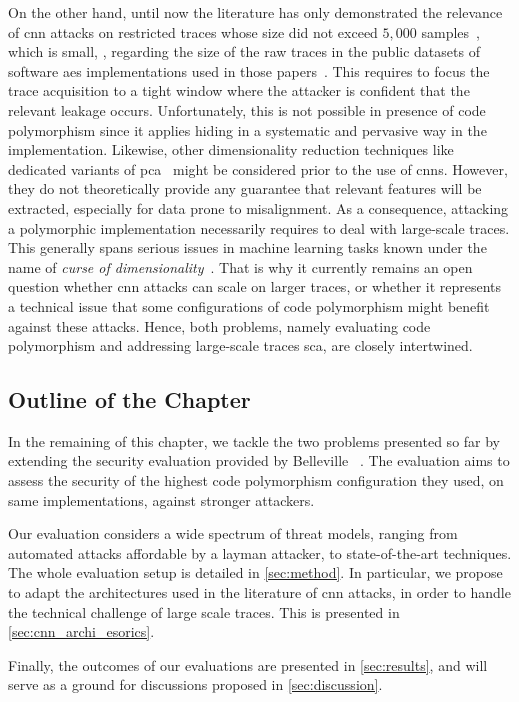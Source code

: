 On the other hand, until now the literature has only demonstrated the relevance of \gls{cnn} attacks on restricted traces whose size did not exceed \(5,000\) samples~\cite{cagli_convolutional_2017,prouff_study_2018,kim_make_2019,timon_non-profiled_2019,zaid_methodology_2019}, which is small, \eg{}, regarding the size of the raw traces in the public datasets of software \gls{aes} implementations used in those papers~\cite{dpa_v4,prouff_study_2018,coron_random_2009}.
This requires to focus the trace acquisition to a tight window where the attacker is confident that the relevant leakage occurs.
Unfortunately, this is not possible in presence of code polymorphism since it applies hiding in a systematic and pervasive way in the implementation.
Likewise, other dimensionality reduction techniques like dedicated variants of \gls{pca}~\cite{standaert_using_2008} might be considered prior to the use of \glspl{cnn}.
However, they do not theoretically provide any guarantee that relevant features will be extracted, especially for data prone to misalignment.
As a consequence, attacking a polymorphic implementation necessarily requires to deal with large-scale traces.
This generally spans serious issues in machine learning tasks known under the name of \emph{curse of dimensionality}~\cite{shalev-shwartz_understanding_2014}.
That is why it currently remains an open question whether \gls{cnn} attacks can scale on larger traces, or whether it represents a technical issue that some configurations of code polymorphism might benefit against these attacks.
Hence, both problems, namely evaluating code polymorphism and addressing large-scale traces \gls{sca}, are closely intertwined.

\subsection{Outline of the Chapter}
\label{sec:contribution_esorics}

In the remaining of this chapter, we tackle the two problems presented so far by extending the security evaluation provided by Belleville \etal{}~\cite{belleville_automated_2019}.
The evaluation aims to assess the security of the highest code polymorphism configuration they used, on same implementations, against stronger attackers.

Our evaluation considers a wide spectrum of threat models, ranging from automated attacks affordable by a layman attacker, to state-of-the-art techniques.
The whole evaluation setup is detailed in \autoref{sec:method}.
In particular, we propose to adapt the architectures used in the literature of \gls{cnn} attacks, in order to handle the technical challenge of large scale traces.
This is presented in \autoref{sec:cnn_archi_esorics}.

Finally, the outcomes of our evaluations are presented in \autoref{sec:results}, and will serve as a ground for discussions proposed in \autoref{sec:discussion}.